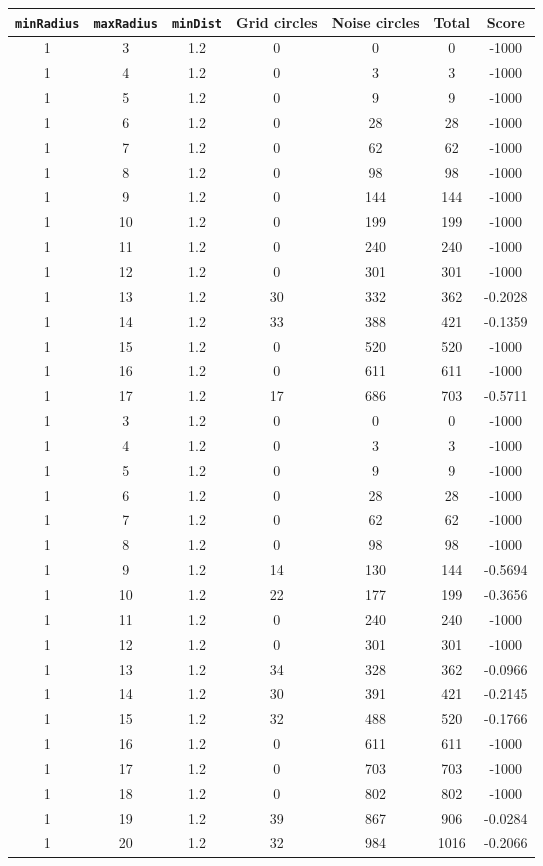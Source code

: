 \documentclass[letterpaper, 12pt]{article}
\begin{document}
\begin{longtable}{|c|c|c|c|c|c|c|}
\hline
\textbf{\texttt{minRadius}} & \textbf{\texttt{maxRadius}} & \textbf{\texttt{minDist}} & \textbf{Grid circles} & \textbf{Noise circles} & \textbf{Total} & \textbf{Score} \\
\hline
1 & 3 & 1.2 & 0 & 0 & 0 & -1000 \\
\hline
1 & 4 & 1.2 & 0 & 3 & 3 & -1000 \\
\hline
1 & 5 & 1.2 & 0 & 9 & 9 & -1000 \\
\hline
1 & 6 & 1.2 & 0 & 28 & 28 & -1000 \\
\hline
1 & 7 & 1.2 & 0 & 62 & 62 & -1000 \\
\hline
1 & 8 & 1.2 & 0 & 98 & 98 & -1000 \\
\hline
1 & 9 & 1.2 & 0 & 144 & 144 & -1000 \\
\hline
1 & 10 & 1.2 & 0 & 199 & 199 & -1000 \\
\hline
1 & 11 & 1.2 & 0 & 240 & 240 & -1000 \\
\hline
1 & 12 & 1.2 & 0 & 301 & 301 & -1000 \\
\hline
1 & 13 & 1.2 & 30 & 332 & 362 & -0.2028 \\
\hline
1 & 14 & 1.2 & 33 & 388 & 421 & -0.1359 \\
\hline
1 & 15 & 1.2 & 0 & 520 & 520 & -1000 \\
\hline
1 & 16 & 1.2 & 0 & 611 & 611 & -1000 \\
\hline
1 & 17 & 1.2 & 17 & 686 & 703 & -0.5711 \\
\hline
1 & 3 & 1.2 & 0 & 0 & 0 & -1000 \\
\hline
1 & 4 & 1.2 & 0 & 3 & 3 & -1000 \\
\hline
1 & 5 & 1.2 & 0 & 9 & 9 & -1000 \\
\hline
1 & 6 & 1.2 & 0 & 28 & 28 & -1000 \\
\hline
1 & 7 & 1.2 & 0 & 62 & 62 & -1000 \\
\hline
1 & 8 & 1.2 & 0 & 98 & 98 & -1000 \\
\hline
1 & 9 & 1.2 & 14 & 130 & 144 & -0.5694 \\
\hline
1 & 10 & 1.2 & 22 & 177 & 199 & -0.3656 \\
\hline
1 & 11 & 1.2 & 0 & 240 & 240 & -1000 \\
\hline
1 & 12 & 1.2 & 0 & 301 & 301 & -1000 \\
\hline
1 & 13 & 1.2 & 34 & 328 & 362 & -0.0966 \\
\hline
1 & 14 & 1.2 & 30 & 391 & 421 & -0.2145 \\
\hline
1 & 15 & 1.2 & 32 & 488 & 520 & -0.1766 \\
\hline
1 & 16 & 1.2 & 0 & 611 & 611 & -1000 \\
\hline
1 & 17 & 1.2 & 0 & 703 & 703 & -1000 \\
\hline
1 & 18 & 1.2 & 0 & 802 & 802 & -1000 \\
\hline
1 & 19 & 1.2 & 39 & 867 & 906 & -0.0284 \\
\hline
1 & 20 & 1.2 & 32 & 984 & 1016 & -0.2066 \\
\hline
\end{longtable}
\end{document}
